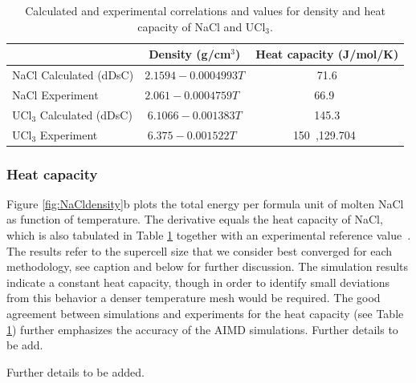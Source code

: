 \documentclass[preprint,3p,10pt,onecolumn,number,sort&compress]{elsarticle}
\begin{document}
\begin{table}[hb!]
\centering
\begin{tabular}{lcc}
\hline
\hline
& Density (g/cm$^3$) &Heat capacity (J/mol/K) \\
\hline
NaCl Calculated (dDsC)	&$2.1594-0.0004993T$ &71.6 \\
NaCl Experiment	&$2.061-0.0004759T$~\cite{Janz1988} &66.9~\cite{NIST}  \\
UCl$_3$ Calculated (dDsC) &$6.1066-0.001383T$ &145.3 \\	
UCl$_3$ Experiment	&$6.375-0.001522T$~\cite{Desyatnik} &150~\cite{BENES2008},129.704~\cite{YIN2020} \\
\hline
\hline
\end{tabular}
\caption{Calculated and experimental correlations and values for density and heat capacity of NaCl and UCl$_3$.}%
\label{table:NaCldensityetc}
\end{table}

\subsubsection{Heat capacity} 
Figure \ref{fig:NaCldensity}b plots the total energy per formula unit of molten NaCl as function of temperature. The derivative equals the heat capacity of NaCl, which is also tabulated in Table \ref{table:NaCldensityetc} together with an experimental reference value~\cite{NIST}. The results refer to the supercell size that we consider best converged for each methodology, see caption and below for further discussion. The simulation results indicate a constant heat capacity, though in order to identify small deviations from this behavior a denser temperature mesh would be required. The good agreement between simulations and experiments for the heat capacity (see Table \ref{table:NaCldensityetc}) further emphasizes the accuracy of the AIMD simulations. {\color{red}Further details to be add.}


{\color{red}Further details to be added.}
\end{document}
